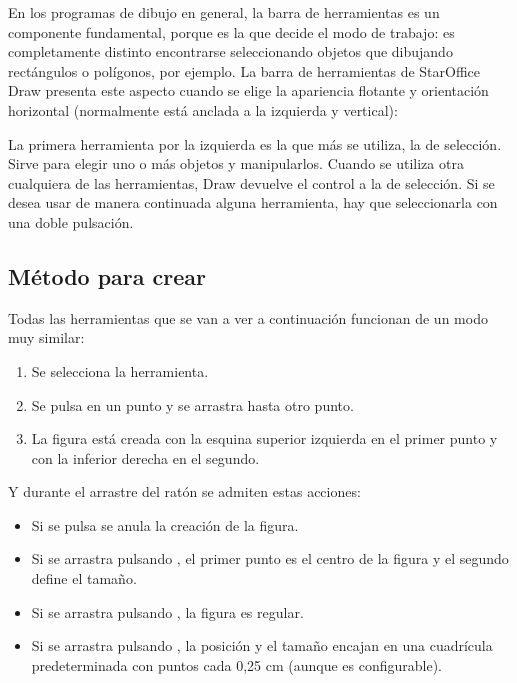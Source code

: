 En los programas de dibujo en general, la barra de herramientas es un
componente fundamental, porque es la que decide el modo de trabajo: es
completamente distinto encontrarse seleccionando objetos que dibujando
rectángulos o polígonos, por ejemplo. La barra de herramientas de
StarOffice Draw presenta este aspecto cuando se elige la apariencia
flotante y orientación horizontal (normalmente está anclada a la
izquierda y vertical):

La primera herramienta por la izquierda es la que más se utiliza, la
de selección. Sirve para elegir uno o más objetos y
manipularlos. Cuando se utiliza otra cualquiera de las herramientas,
Draw devuelve el control a la de selección. Si se desea usar de manera
continuada alguna herramienta, hay que seleccionarla con una doble
pulsación.

\subsection{Método para crear}

Todas las herramientas que se van a ver a continuación funcionan de un
modo muy similar:

\begin{enumerate}
\item Se selecciona la herramienta.

\item Se pulsa en un punto y se arrastra hasta otro punto.

\item La figura está creada con la esquina superior izquierda en el 
primer punto y con la inferior derecha en el segundo.
\end{enumerate}

Y durante el arrastre del ratón se admiten estas acciones:

\begin{itemize}
\item Si se pulsa  se anula la creación de la figura.

\item Si se arrastra pulsando , el primer punto es el 
centro de la figura y el segundo define el tamaño.

\item Si se arrastra pulsando , la figura es regular.

\item Si se arrastra pulsando , la posición y el tamaño 
encajan en una cuadrícula predeterminada con puntos cada 0,25 cm 
(aunque es configurable).
\end{itemize}

